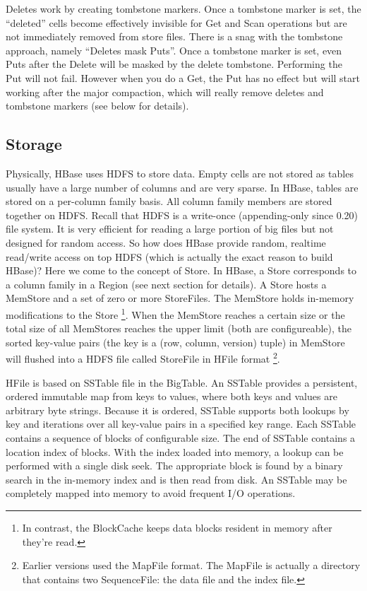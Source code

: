 \documentclass[11pt]{book}
\begin{document}
Deletes work by creating tombstone markers. Once a tombstone marker is set, the ``deleted'' cells become effectively invisible for Get and Scan operations but are not immediately removed from store files. There is a snag with the tombstone approach, namely ``Deletes mask Puts''. Once a tombstone marker is set, even Puts after the Delete will be masked by the delete tombstone. Performing the Put will not fail. However when you do a Get, the Put has no effect but will start working  after the major compaction, which will really remove deletes and tombstone markers (see below for details).

\subsection{Storage}

Physically, HBase uses HDFS to store data. Empty cells are not stored as tables usually have a large number of columns and are very sparse. In HBase, tables are stored on a per-column family basis. All column family members are stored together on HDFS. 
Recall that HDFS is a write-once (appending-only since 0.20) file system. It is very efficient for reading a large portion of  big files but not designed for random access. So how does HBase provide random, realtime read/write access on top HDFS (which is actually the exact reason to build HBase)? Here we come to the concept of Store. In HBase, a Store corresponds to a column family in a Region (see next section for details). A Store hosts a MemStore and a set of zero or more StoreFiles. The MemStore holds in-memory modifications to the Store \footnote{In contrast, the BlockCache keeps data blocks resident in memory after they're read.}. When the MemStore reaches a certain size or the total size of all MemStores reaches the upper limit (both are configureable), the sorted key-value pairs (the key is a (row, column, version) tuple) in MemStore will flushed into a HDFS file called StoreFile in HFile format \footnote{Earlier versions used the MapFile format. The MapFile is actually a directory that contains two SequenceFile: the data file and the index file. }.

HFile is based on SSTable file in the BigTable. An SSTable provides a persistent, ordered immutable map from keys to values, where both keys and values are arbitrary byte strings. Because it is ordered, SSTable supports both lookups by key and iterations over all key-value pairs in a specified key range. Each SSTable contains a sequence of blocks of configurable size. The end of SSTable contains a location index of blocks. With the index loaded into memory, a lookup can be performed with a single disk seek. The appropriate block is found by a binary search in the in-memory index and is then read from disk. An SSTable may be completely mapped into memory to avoid frequent I/O operations.
\end{document}

